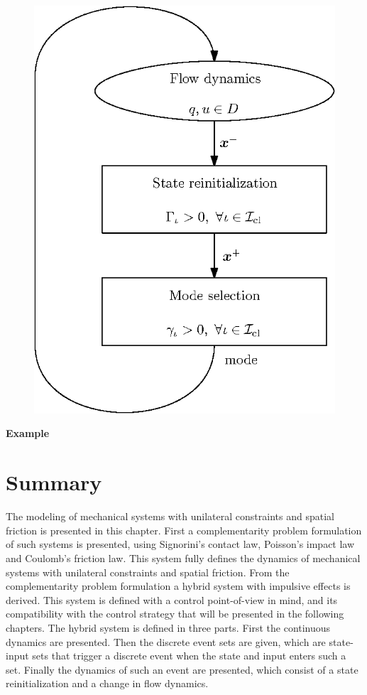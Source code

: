 \documentclass[../DC2017114Bouma.tex]{subfiles}
\begin{document}
\begin{figure}[h]
\centering
\includegraphics[width=.6\textwidth]{hybridalg.eps}\caption{} \label{fig:2hybridalg}
\end{figure}

\textbf{Example}

\section{Summary}
The modeling of mechanical systems with unilateral constraints and spatial friction is presented in this chapter. First a complementarity problem formulation of such systems is presented, using Signorini's contact law, Poisson's impact law and Coulomb's friction law. This system fully defines the dynamics of mechanical systems with unilateral constraints and spatial friction. From the complementarity problem formulation a hybrid system with impulsive effects is derived. This system is defined with a control point-of-view in mind, and its compatibility with the control strategy that will be presented in the following chapters. The hybrid system is defined in three parts. First the continuous dynamics are presented. Then the discrete event sets are given, which are state-input sets that trigger a discrete event when the state and input enters such a set. Finally the dynamics of such an event are presented, which consist of a state reinitialization and a change in flow dynamics.
\end{document}
